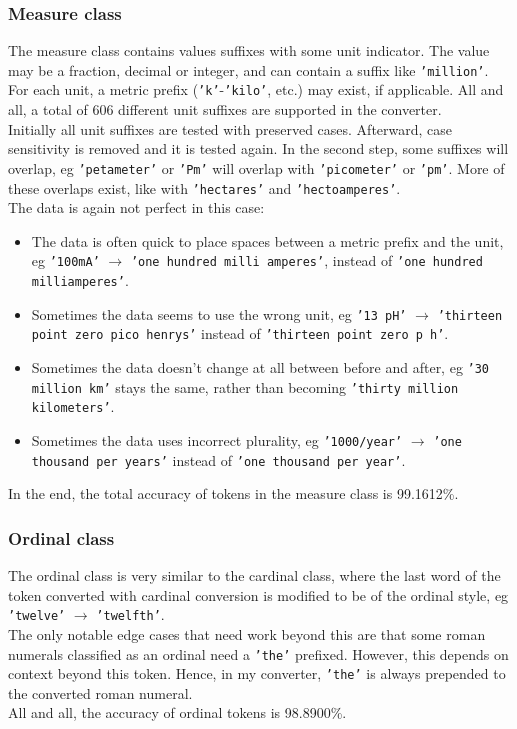\documentclass[a4paper, 9pt]{extarticle}
\newcommand{\str}[1]{\texttt{'#1'}}
\begin{document}
\subsubsection{Measure class}
The measure class contains values suffixes with some unit indicator. The value may be a fraction, decimal or integer, and can contain a suffix like \str{million}. For each unit, a metric prefix (\str{k}-\str{kilo}, etc.) may exist, if applicable. All and all, a total of 606 different unit suffixes are supported in the converter.\\
Initially all unit suffixes are tested with preserved cases. Afterward, case sensitivity is removed and it is tested again. In the second step, some suffixes will overlap, eg \str{petameter} or \str{Pm} will overlap with \str{picometer} or \str{pm}. More of these overlaps exist, like with \str{hectares} and \str{hectoamperes}.\\
The data is again not perfect in this case:
\begin{itemize}
    \itemsep-0.3em
    \item The data is often quick to place spaces between a metric prefix and the unit, eg \str{100mA} $\to$ \str{one hundred milli amperes}, instead of \str{one hundred milliamperes}.
    \item Sometimes the data seems to use the wrong unit, eg \str{13 pH} $\to$ \str{thirteen point zero pico henrys} instead of \str{thirteen point zero p h}.
    \item Sometimes the data doesn't change at all between before and after, eg \str{30 million km} stays the same, rather than becoming \str{thirty million kilometers}.
    \item Sometimes the data uses incorrect plurality, eg \str{1000/year} $\to$ \str{one thousand per years} instead of \str{one thousand per year}.
\end{itemize}
In the end, the total accuracy of tokens in the measure class is 99.1612\%.

\subsubsection{Ordinal class}
The ordinal class is very similar to the cardinal class, where the last word of the token converted with cardinal conversion is modified to be of the ordinal style, eg \str{twelve} $\to$ \str{twelfth}.\\
The only notable edge cases that need work beyond this are that some roman numerals classified as an ordinal need a \str{the} prefixed. However, this depends on context beyond this token. Hence, in my converter, \str{the} is always prepended to the converted roman numeral.\\
All and all, the accuracy of ordinal tokens is 98.8900\%.
\end{document}
